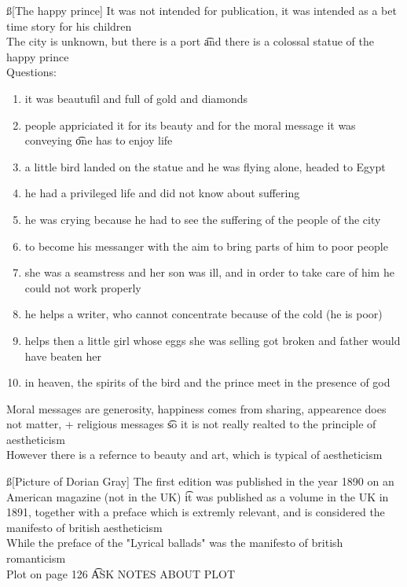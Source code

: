 \documentclass[12pt]{article}
\begin{document}
\ss[The happy prince]
It was not intended for publication, it was intended as a bet time story for his children \\
The city is unknown, but there is a port \t and there is a colossal statue of the happy prince \\
Questions:
\begin{enumerate}
  \item it was beautufil and full of gold and diamonds
  \item people appriciated it for its beauty and for the moral message it was conveying \t one has to enjoy life
  \item a little bird landed on the statue and he was flying alone, headed to Egypt
  \item he had a privileged life and did not know about suffering
  \item he was crying because he had to see the suffering of the people of the city
  \item to become his messanger with the aim to bring parts of him to poor people
  \item she was a seamstress and her son was ill, and in order to take care of him he could not work properly
  \item he helps a writer, who cannot concentrate because of the cold (he is poor)
  \item helps then a little girl whose eggs she was selling got broken and father would have beaten her
  \item in heaven, the spirits of the bird and the prince meet in the presence of god
\end{enumerate}
Moral messages are generosity, happiness comes from sharing, appearence does not matter, + religious messages \t so it is not really realted to the principle of aestheticism \\
However there is a refernce to beauty and art, which is typical of aestheticism

\ss[Picture of Dorian Gray]
The first edition was published in the year 1890 on an American magazine (not in the UK) \t it was published as a volume in the UK in 1891, together with a preface which is extremly relevant, and is considered the manifesto of british aestheticism \\
While the preface of the "Lyrical ballads" was the manifesto of british romanticism \\
Plot on page 126 \t ASK NOTES ABOUT PLOT
\end{document}
